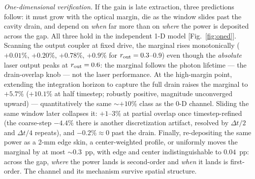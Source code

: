 \documentclass[aps,pra,preprint,longbibliography,nofootinbib]{revtex4-2}
\begin{document}
\emph{One-dimensional verification.} If the gain is late extraction,
three predictions follow: it must grow with the optical margin, die as
the window slides past the cavity drain, and depend on \emph{when} far
more than on \emph{where} the power is deposited across the gap. All
three hold in the independent 1-D model [Fig.~\ref{fig:oned}].
Scanning the output coupler at fixed drive, the marginal rises
monotonically ($+0.01\%$, $+0.20\%$, $+0.78\%$, $+0.9\%$ for
$r_{\rm out}=0.3$--$0.9$) even though the \emph{absolute} laser output
peaks at $r_{\rm out}=0.6$: the marginal follows the photon lifetime
--- the drain-overlap knob --- not the laser performance. At the
high-margin point, extending the integration horizon to capture the
full drain raises the marginal to $+5.7\%$ ($+10.1\%$ at half
timestep; robustly positive, magnitude unconverged upward) ---
quantitatively the same ${\sim}+10\%$ class as the 0-D channel.
Sliding the same window later collapses it: $+1$--$3\%$ at partial
overlap once timestep-refined (the coarse-step $-4.4\%$ there is
another discretization artifact, resolved by $\Delta t/2$ and
$\Delta t/4$ repeats), and $-0.2\%\approx0$ past the drain. Finally,
re-depositing the same power as a 2-mm edge skin, a center-weighted
profile, or uniformly moves the marginal by at most ${\sim}0.3$~pp,
with edge and center indistinguishable to $0.04$~pp: across the gap,
\emph{where} the power lands is second-order and \emph{when} it lands
is first-order. The channel and its mechanism survive spatial
structure.
\end{document}
